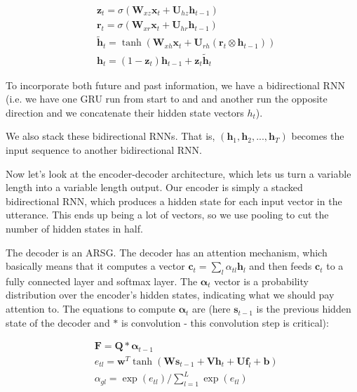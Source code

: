 \documentclass[a4paper]{article}
\begin{document}
\begin{align}
  & \mathbf{z}_t = \sigma(
    \mathbf{W}_{xz} \mathbf{x}_t
    + \mathbf{U}_{hz} \mathbf{h}_{t-1}
  ) \\
  & \mathbf{r}_t = \sigma(
    \mathbf{W}_{xr} \mathbf{x}_t
    + \mathbf{U}_{hr} \mathbf{h}_{t-1}
  ) \\
  & \tilde{\mathbf{h}}_t = \tanh(
    \mathbf{W}_{xh} \mathbf{x}_t
    + \mathbf{U}_{rh}(\mathbf{r}_t \otimes \mathbf{h}_{t-1})
  ) \\
  & \mathbf{h}_t = (1 - \mathbf{z}_t) \mathbf{h}_{t-1}
    + \mathbf{z}_t \tilde{\mathbf{h}}_t
\end{align}

To incorporate both future and past information, we have a bidirectional
RNN (i.e. we have one GRU run from start to and and another run the opposite
direction and we concatenate their hidden state vectors $h_t$).

We also stack these bidirectional RNNs. That is,
$(\mathbf{h}_1, \mathbf{h}_2, ..., \mathbf{h}_T)$ becomes the input sequence
to another bidirectional RNN.

Now let's look at the encoder-decoder architecture, which lets us turn a
variable length into a variable length output. Our encoder is simply a
stacked bidirectional RNN, which produces a hidden state for each input
vector in the utterance. This ends up being a lot of vectors, so we use
pooling to cut the number of hidden states in half.

The decoder is an ARSG. The decoder has an attention
mechanism, which basically means that it computes a vector $\mathbf{c}_t =
\sum_{l}{\alpha_{tl} \mathbf{h}_l}$ and then feeds $\mathbf{c}_t$ to
a fully connected layer and softmax layer. The $\mathbf{\alpha}_t$ vector
is a probability distribution over the encoder's hidden states, indicating
what we should pay attention to. The equations to compute $\mathbf{\alpha}_t$
are (here $\mathbf{s}_{t-1}$ is the previous hidden state of the decoder
and $*$ is convolution - this convolution step is critical):

\begin{align}
  & \mathbf{F} = \mathbf{Q} * \mathbf{\alpha}_{t-1} \\
  & e_{tl} = \mathbf{w}^T \tanh{(
    \mathbf{W} \mathbf{s}_{t-1}
    + \mathbf{V} \mathbf{h}_t
    + \mathbf{U} \mathbf{f}_l
    + \mathbf{b}
  )} \\
  & \alpha_{gl} = \exp(e_{tl})/\sum_{l=1}^{L}{\exp(e_{tl})}
\end{align}
\end{document}
